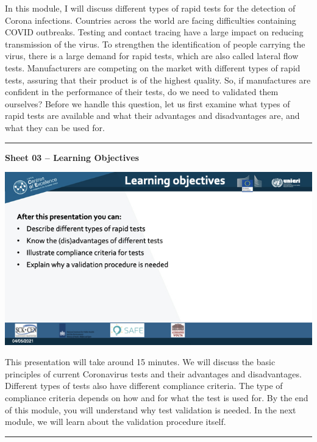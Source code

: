 \documentclass[
]{book}
\begin{document}
In this module, I will discuss different types of rapid tests for the
detection of Corona infections. Countries across the world are facing
difficulties containing COVID outbreaks. Testing and contact tracing
have a large impact on reducing transmission of the virus. To strengthen
the identification of people carrying the virus, there is a large demand
for rapid tests, which are also called lateral flow tests. Manufacturers
are competing on the market with different types of rapid tests,
assuring that their product is of the highest quality. So, if
manufactures are confident in the performance of their tests, do we need
to validated them ourselves? Before we handle this question, let us
first examine what types of rapid tests are available and what their
advantages and disadvantages are, and what they can be used for.

\begin{center}\rule{0.5\linewidth}{0.5pt}\end{center}

\textbf{Sheet 03 -- Learning Objectives}

\includegraphics{images/m02/m02_types_of_rapid_tests_final.003.jpeg}

This presentation will take around 15 minutes. We will discuss the basic
principles of current Coronavirus tests and their advantages and
disadvantages. Different types of tests also have different compliance
criteria. The type of compliance criteria depends on how and for what
the test is used for. By the end of this module, you will understand why
test validation is needed. In the next module, we will learn about the
validation procedure itself.

\begin{center}\rule{0.5\linewidth}{0.5pt}\end{center}
\end{document}
